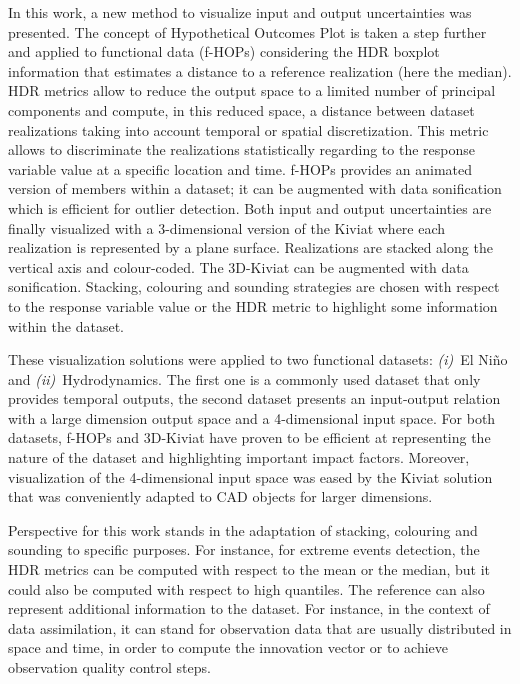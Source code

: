 In this work, a new method to visualize input and output uncertainties  was presented. The concept of Hypothetical Outcomes Plot is taken a step further and applied to functional data (f-HOPs) considering the HDR boxplot information that estimates a distance to a reference realization (here the median). HDR metrics allow to reduce the output space to a limited number of principal components and compute, in this reduced space, a distance between dataset realizations taking into account temporal or spatial discretization. This metric allows to discriminate the realizations statistically regarding to the response variable value at a specific location and time. f-HOPs provides an animated version of members within a dataset; it can be augmented with data sonification which is efficient for outlier detection. Both input and output uncertainties are finally visualized with a 3-dimensional version of the Kiviat where each realization is represented by a plane surface. Realizations are stacked along the vertical axis and colour-coded. The 3D-Kiviat can be augmented with data sonification. Stacking, colouring and sounding strategies are chosen with respect to the response variable value or the HDR metric to highlight some information within the dataset.

These visualization solutions were applied to two functional datasets: \emph{(i)}~El Niño and \emph{(ii)}~Hydrodynamics. The first one is a commonly used dataset that only provides temporal outputs, the second dataset presents an input-output relation with a large dimension output space and a 4-dimensional input space. For both datasets, f-HOPs and 3D-Kiviat have proven to be efficient at representing the nature of the dataset and highlighting important impact factors. Moreover, visualization of the 4-dimensional input space was eased by the Kiviat solution that was conveniently adapted to CAD objects for larger dimensions. 

Perspective for this work stands in the adaptation of stacking, colouring and sounding to specific purposes. For instance, for extreme events detection, the HDR metrics can be computed with respect to the mean or the median, but it could also be computed with respect to high quantiles.
The reference can also represent additional information to the dataset. For instance, in the context of data assimilation, it can stand for observation data that are usually distributed in space and time, in order to compute the innovation vector or to achieve observation quality control steps.

